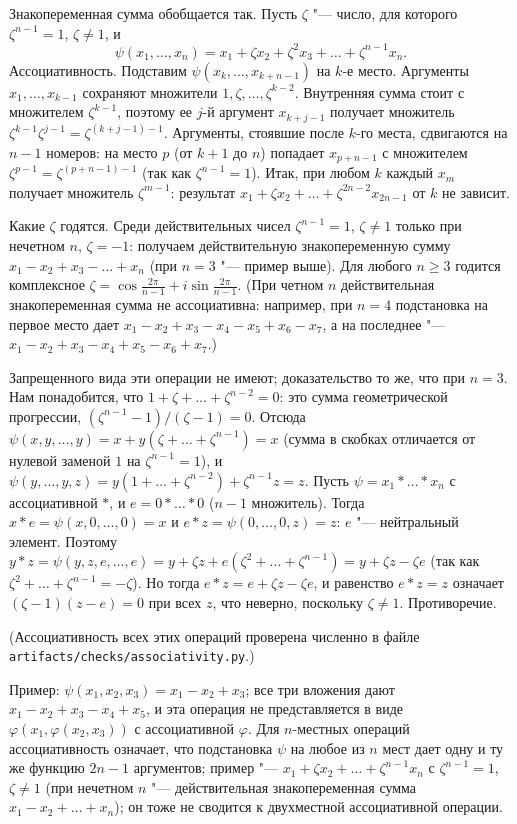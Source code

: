 \begin{solution}[6 (\S\,4)]
Знакопеременная сумма обобщается так. Пусть $\zeta$ "--- число, для которого
$\zeta^{n-1}=1$, $\zeta\ne1$, и
\[
\psi(x_1,\dots,x_n)=x_1+\zeta x_2+\zeta^2x_3+\dots+\zeta^{n-1}x_n .
\]
Ассоциативность. Подставим $\psi(x_k,\dots,x_{k+n-1})$ на $k$-е место.
Аргументы $x_1,\dots,x_{k-1}$ сохраняют множители $1,\zeta,\dots,\zeta^{k-2}$.
Внутренняя сумма стоит с множителем $\zeta^{k-1}$, поэтому ее $j$-й аргумент
$x_{k+j-1}$ получает множитель $\zeta^{k-1}\zeta^{j-1}=\zeta^{(k+j-1)-1}$.
Аргументы, стоявшие после $k$-го места, сдвигаются на $n-1$ номеров:
на место $p$ (от $k+1$ до $n$) попадает $x_{p+n-1}$ с множителем
$\zeta^{p-1}=\zeta^{(p+n-1)-1}$ (так как $\zeta^{n-1}=1$). Итак, при любом $k$
каждый $x_m$ получает множитель $\zeta^{m-1}$:
результат $x_1+\zeta x_2+\dots+\zeta^{2n-2}x_{2n-1}$ от $k$ не зависит.

Какие $\zeta$ годятся. Среди действительных чисел $\zeta^{n-1}=1$, $\zeta\ne1$
только при нечетном $n$, $\zeta=-1$: получаем действительную знакопеременную
сумму $x_1-x_2+x_3-\dots+x_n$ (при $n=3$ "--- пример выше). Для любого $n\ge3$
годится комплексное $\zeta=\cos\frac{2\pi}{n-1}+i\sin\frac{2\pi}{n-1}$.
(При четном $n$ действительная знакопеременная сумма не ассоциативна:
например, при $n=4$ подстановка на первое место дает
$x_1-x_2+x_3-x_4-x_5+x_6-x_7$, а на последнее "---
$x_1-x_2+x_3-x_4+x_5-x_6+x_7$.)

Запрещенного вида эти операции не имеют; доказательство то же, что при
$n=3$. Нам понадобится, что $1+\zeta+\dots+\zeta^{n-2}=0$: это сумма
геометрической прогрессии, $(\zeta^{n-1}-1)/(\zeta-1)=0$. Отсюда
$\psi(x,y,\dots,y)=x+y(\zeta+\dots+\zeta^{n-1})=x$ (сумма в скобках
отличается от нулевой заменой $1$ на $\zeta^{n-1}=1$), и
$\psi(y,\dots,y,z)=y(1+\dots+\zeta^{n-2})+\zeta^{n-1}z=z$. Пусть
$\psi=x_1*\dots*x_n$ с ассоциативной $*$, и $e=0*\dots*0$ ($n-1$
множитель). Тогда $x*e=\psi(x,0,\dots,0)=x$ и $e*z=\psi(0,\dots,0,z)=z$:
$e$ "--- нейтральный элемент. Поэтому
$y*z=\psi(y,z,e,\dots,e)=y+\zeta z+e(\zeta^2+\dots+\zeta^{n-1})=y+\zeta z-\zeta e$
(так как $\zeta^2+\dots+\zeta^{n-1}=-\zeta$). Но тогда
$e*z=e+\zeta z-\zeta e$, и равенство $e*z=z$ означает $(\zeta-1)(z-e)=0$ при
всех $z$, что неверно, поскольку $\zeta\ne1$. Противоречие.

(Ассоциативность всех этих операций проверена численно в файле
\texttt{artifacts/checks/associativity.py}.)

\answer Пример: $\psi(x_1,x_2,x_3)=x_1-x_2+x_3$; все три вложения дают
$x_1-x_2+x_3-x_4+x_5$, и эта операция не представляется в виде
$\varphi(x_1,\varphi(x_2,x_3))$ с ассоциативной $\varphi$. Для $n$-местных
операций ассоциативность означает, что подстановка $\psi$ на любое из $n$
мест дает одну и ту же функцию $2n-1$ аргументов; пример "---
$x_1+\zeta x_2+\dots+\zeta^{n-1}x_n$ с $\zeta^{n-1}=1$, $\zeta\ne1$ (при нечетном
$n$ "--- действительная знакопеременная сумма $x_1-x_2+\dots+x_n$); он
тоже не сводится к двухместной ассоциативной операции.
\end{solution}

